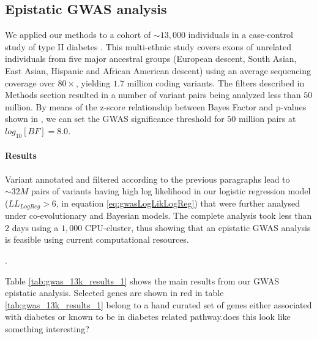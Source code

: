 \subsection{Epistatic GWAS analysis}

We applied our methods to a cohort of $\sim 13,000$ individuals in a case-control study of type II diabetes \cite{mccarthy2015T2D}.
This multi-ethnic study covers exons of unrelated individuals from five major ancestral groups (European descent, South Asian, East Asian, Hispanic and African American descent) using an average sequencing coverage over $80 \times$, yielding $1.7$ million coding variants. The filters described in Methods section resulted in a number of variant pairs being analyzed less than $50$ million. By means of the z-score relationship between Bayes Factor and p-values shown in \cite{goodman1999toward}, we can set the GWAS significance threshold for $50$ million pairs at $log_{10}[BF] =  8.0$.

\paragraph{Results} Variant annotated and filtered according to the previous paragraphs lead to $\sim 32M$ pairs of variants having high log likelihood in our logistic regression model  ($LL_{LogReg} > 6$, in equation \ref{eq:gwasLogLikLogReg}) that were further analysed under co-evolutionary and Bayesian models.
The complete analysis took less than $2$ days using a $1,000$ CPU-cluster, thus showing that an epistatic GWAS analysis is feasible using current computational resources. 

.

Table \ref{tab:gwas_13k_results_1} shows the main results from our GWAS epistatic analysis.
Selected genes are shown in red in table \ref{tab:gwas_13k_results_1} belong to a hand curated set of genes either associated with diabetes or known to be in diabetes related pathway.{\huge does this look like something interesting?}


